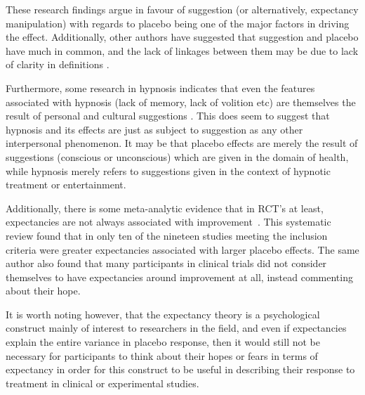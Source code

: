  These research findings argue in favour of  suggestion (or alternatively, expectancy manipulation) with regards to placebo being one of the major factors in driving the effect. Additionally, other authors have suggested that suggestion and placebo have much in common, and the lack of linkages between them may be due to lack of clarity in definitions \cite{DePascalis2002}. 


Furthermore, some research in hypnosis indicates that even the features associated with hypnosis (lack of memory, lack of volition etc) are themselves the result of personal and cultural suggestions \cite{Kirsch1999}. This does seem to suggest that hypnosis and its effects are just as subject to suggestion as any other interpersonal phenomenon.  It may be that placebo effects are merely the result of suggestions (conscious or unconscious) which are given in the domain of health, while hypnosis merely refers to suggestions given in the context of hypnotic treatment or entertainment. 

Additionally, there is some meta-analytic evidence that in RCT's at least, expectancies are not always associated with improvement~\cite{DiBlasi2001}. This systematic review found that in only ten of the nineteen studies meeting the inclusion criteria were greater expectancies associated with larger placebo effects. The same author also found that many participants in clinical trials did not consider themselves to have expectancies around improvement at all, instead commenting about their hope. 

It is worth noting however, that the expectancy theory is a psychological construct mainly of interest to researchers in the field, and even if expectancies explain the entire variance in placebo response, then it would still not be necessary for participants to think about their hopes or fears in terms of expectancy in order for this construct to be  useful  in describing their response to treatment in clinical or experimental studies. 

